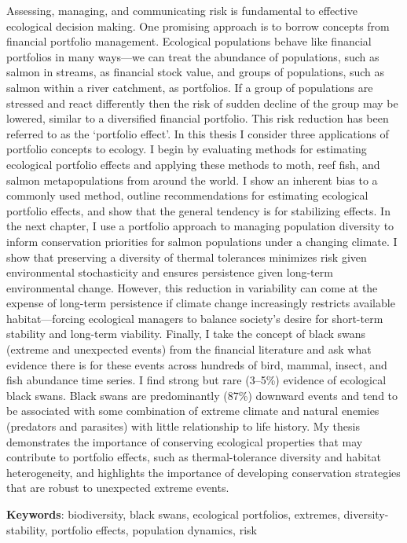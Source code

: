 
Assessing, managing, and communicating risk is fundamental to effective
ecological decision making. One promising approach is to borrow concepts
from financial portfolio management. Ecological populations behave like
financial portfolios in many ways---we can treat the abundance of
populations, such as salmon in streams, as financial stock value, and
groups of populations, such as salmon within a river catchment, as
portfolios. If a group of populations are stressed and react differently
then the risk of sudden decline of the group may be lowered, similar to
a diversified financial portfolio. This risk reduction has been referred
to as the `portfolio effect'. In this thesis I consider three
applications of portfolio concepts to ecology. I begin by evaluating
methods for estimating ecological portfolio effects and applying these
methods to moth, reef fish, and salmon metapopulations from around the
world. I show an inherent bias to a commonly used method, outline
recommendations for estimating ecological portfolio effects, and show
that the general tendency is for stabilizing effects. In the next
chapter, I use a portfolio approach to managing population diversity to
inform conservation priorities for salmon populations under a changing
climate. I show that preserving a diversity of thermal tolerances
minimizes risk given environmental stochasticity and ensures persistence
given long-term environmental change. However, this reduction in
variability can come at the expense of long-term persistence if climate
change increasingly restricts available habitat---forcing ecological
managers to balance society's desire for short-term stability and
long-term viability. Finally, I take the concept of black swans (extreme
and unexpected events) from the financial literature and ask what
evidence there is for these events across hundreds of bird, mammal,
insect, and fish abundance time series. I find strong but rare (3--5\%)
evidence of ecological black swans. Black swans are predominantly (87\%)
downward events and tend to be associated with some combination of
extreme climate and natural enemies (predators and parasites) with
little relationship to life history. My thesis demonstrates the
importance of conserving ecological properties that may contribute to
portfolio effects, such as thermal-tolerance diversity and habitat
heterogeneity, and highlights the importance of developing conservation
strategies that are robust to unexpected extreme events.

\bigskip
\noindent
\textbf{Keywords}: biodiversity, black swans, ecological portfolios,
extremes, diversity-stability, portfolio effects, population dynamics,
risk
